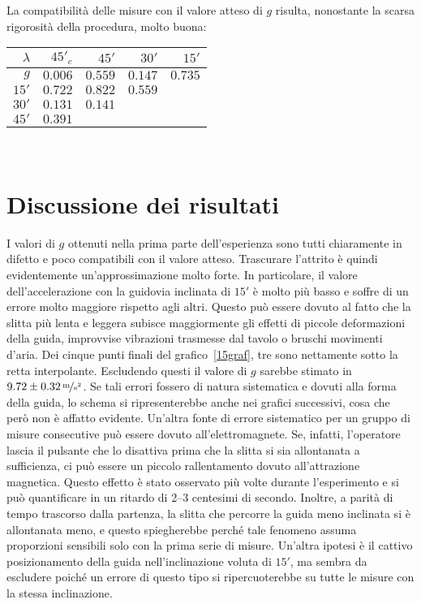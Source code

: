 \documentclass[italian,a4paper]{article}
\begin{document}
La compatibilità delle misure con il valore atteso di $g$ risulta, nonostante la scarsa rigorosità della procedura, molto buona:
\begin{table}[h]\centering
\begin{tabular}{r|*4{r}}
  $\lambda$	& $45'_c$ 	& $45'$ 	& $30'$ 	&$15'$	\\
 \hline
 $g$ 		& $0.006$	& $0.559$	&$0.147$	&$0.735$\\
 $15'$  	& $0.722$	& $0.822$	&$0.559$	& \\
 $30'$  	& $0.131$	& $0.141$	& 	&\\
 $45'$  	& $0.391$	& 		& 	&
\end{tabular}
\end{table}\\
\section{Discussione dei risultati}
I valori di $g$ ottenuti nella prima parte dell'esperienza sono tutti chiaramente in difetto e poco compatibili con il valore atteso. Trascurare l'attrito è quindi evidentemente un'approssimazione molto forte. In particolare, il valore dell'accelerazione con la guidovia inclinata di $15'$ è molto più basso e soffre di un errore molto maggiore rispetto agli altri. Questo può essere dovuto al fatto che la slitta più lenta e leggera subisce maggiormente gli effetti di piccole deformazioni della guida, improvvise vibrazioni trasmesse dal tavolo o bruschi movimenti d'aria. Dei cinque punti finali del grafico~\ref{15graf}, tre sono nettamente sotto la retta interpolante. Escludendo questi il valore di $g$ sarebbe stimato in $\unitfrac[9.72 \pm 0.32]{m}{s^{2}}$. Se tali errori fossero di natura sistematica e dovuti alla forma della guida, lo schema si ripresenterebbe anche nei grafici successivi, cosa che però non è affatto evidente. Un'altra fonte di errore sistematico per un gruppo di misure consecutive può essere dovuto all'elettromagnete. Se, infatti, l'operatore lascia il pulsante che lo disattiva prima che la slitta si sia allontanata a sufficienza, ci può essere un piccolo rallentamento dovuto all'attrazione magnetica. Questo effetto è stato osservato più volte durante l'esperimento e si può quantificare in un ritardo di 2--3 centesimi di secondo. Inoltre, a parità di tempo trascorso dalla partenza, la slitta che percorre la guida meno inclinata si è allontanata meno, e questo spiegherebbe perché tale fenomeno assuma proporzioni sensibili solo con la prima serie di misure. Un'altra ipotesi è il cattivo posizionamento della guida nell'inclinazione voluta di $15'$, ma sembra da escludere poiché un errore di questo tipo si ripercuoterebbe su tutte le misure con la stessa inclinazione.
\end{document}
